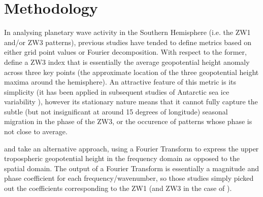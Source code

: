 \section{Methodology}

In analysing planetary wave activity in the Southern Hemisphere (i.e. the ZW1 and/or ZW3 patterns), previous studies have tended to define metrics based on either grid point values or Fourier decomposition. With respect to the former, \citet{Raphael2004} define a ZW3 index that is essentially the average geopotential height anomaly across three key points (the approximate location of the three geopotential height maxima around the hemisphere). An attractive feature of this metric is its simplicity (it has been applied in subsequent studies of Antarctic sea ice variability \citep{Raphael2007,Raphael2014}), however its stationary nature means that it cannot fully capture the subtle (but not insignificant at around 15 degrees of longitude) seasonal migration in the phase of the ZW3, or the occurence of patterns whose phase is not close to average.

\citet{Hobbs2007} and \citet{Hobbs2010} take an alternative approach, using a Fourier Transform to express the upper tropospheric geopotential height in the frequency domain as opposed to the spatial domain. The output of a Fourier Transform is essentially a magnitude and phase coefficient for each frequency/wavenumber, so those studies simply picked out the coefficients corresponding to the ZW1 (and ZW3 in the case of \citet{Hobbs2010}).   
